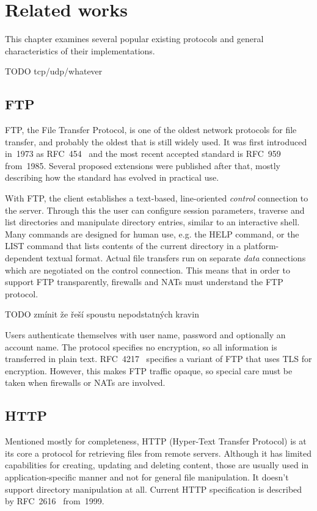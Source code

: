 \chapter{Related works}

This chapter examines several popular existing protocols and general characteristics
of their implementations.

TODO tcp/udp/whatever

\section{FTP}

FTP, the File Transfer Protocol, is one of the oldest network protocols for file transfer, and probably the
oldest that is still widely used. It was first introduced in~1973 as RFC~454~\cite{rfc454} and the most recent
accepted standard is RFC~959~\cite{rfc959} from~1985. Several proposed extensions were published after that,
mostly describing how the standard has evolved in practical use.

With FTP, the client establishes a text-based, line-oriented {\it control} connection to the server. Through this
the user can configure session parameters, traverse and list directories and manipulate directory entries,
similar to an interactive shell. Many commands are designed for human use, e.g. the HELP command, or the LIST
command that lists contents of the current directory in a platform-dependent textual format. Actual file
transfers run on separate {\it data} connections which are negotiated on the control connection. This means that
in order to support FTP transparently, firewalls and NATs must understand the FTP protocol.

TODO zmínit že řeší spoustu nepodstatných kravin

Users authenticate themselves with user name, password and optionally an account name. The protocol specifies
no encryption, so all information is transferred in plain text. RFC~4217~\cite{rfc4217} specifies a variant of
FTP that uses TLS for encryption. However, this makes FTP traffic opaque, so special care must be taken when
firewalls or NATs are involved.

\section{HTTP}

Mentioned mostly for completeness, HTTP (Hyper-Text Transfer Protocol) is at its core a protocol for
retrieving files from remote servers. Although it has limited capabilities for creating, updating and deleting
content, those are usually used in application-specific manner and not for general file manipulation. It
doesn't support directory manipulation at all. Current HTTP specification is described by
RFC~2616~\cite{rfc2616} from~1999.

